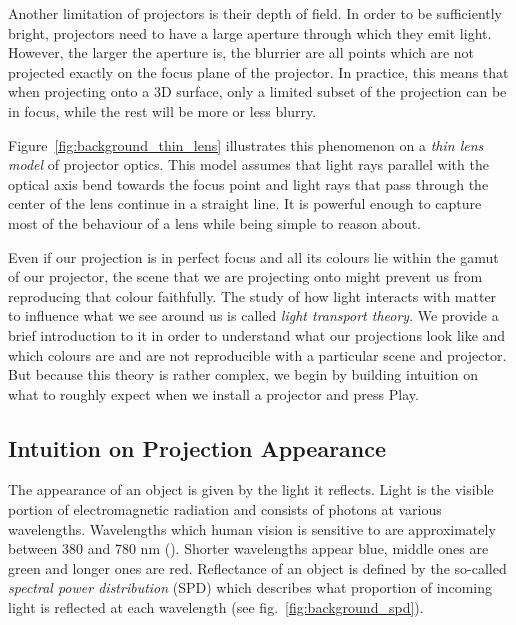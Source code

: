 Another limitation of projectors is their depth of field. In order to be sufficiently bright, projectors need to have a large aperture through which they emit light. However, the larger the aperture is, the blurrier are all points which are not projected exactly on the focus plane of the projector. In practice, this means that when projecting onto a 3D surface, only a limited subset of the projection can be in focus, while the rest will be more or less blurry.

Figure~\ref{fig:background_thin_lens} illustrates this phenomenon on a \textit{thin lens model} of projector optics. This model assumes that light rays parallel with the optical axis bend towards the focus point and light rays that pass through the center of the lens continue in a straight line. It is powerful enough to capture most of the behaviour of a lens while being simple to reason about.

Even if our projection is in perfect focus and all its colours lie within the gamut of our projector, the scene that we are projecting onto might prevent us from reproducing that colour faithfully. The study of how light interacts with matter to influence what we see around us is called \textit{light transport theory}. We provide a brief introduction to it in order to understand what our projections look like and which colours are and are not reproducible with a particular scene and projector. But because this theory is rather complex, we begin by building intuition on what to roughly expect when we install a projector and press Play.

\subsection{Intuition on Projection Appearance}
\label{section:background-projection_mapping-projection_intuition}

The appearance of an object is given by the light it reflects. Light is the visible portion of electromagnetic radiation and consists of photons at various wavelengths. Wavelengths which human vision is sensitive to are approximately between 380 and 780 nm (\citet{PBRT3e}). Shorter wavelengths appear blue, middle ones are green and longer ones are red. Reflectance of an object is defined by the so-called \textit{spectral power distribution} (SPD) which describes what proportion of incoming light is reflected at each wavelength (see fig.~\ref{fig:background_spd}).

